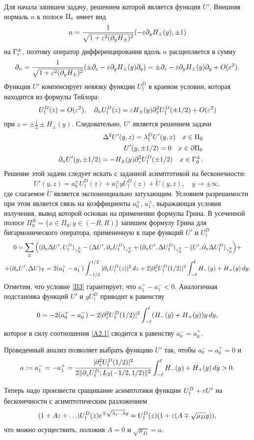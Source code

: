Для начала запишем задачу, решением которой является функция $U'$. Внешняя нормаль $n$ к полосе $\Pi_\varepsilon$ имеет вид
$$
n=\frac{1}{\sqrt{1+\varepsilon^2 (\partial_y H_\pm)^2}}(-\varepsilon \partial_y H_\pm(y), \pm 1)
$$
на $\Gamma_\varepsilon^\pm$, поэтому оператор дифференцирования вдоль $n$ расщепляется в сумму
$$
\partial_n= \frac{1}{\sqrt{1+\varepsilon^2 (\partial_y H_\pm)^2}} (\pm \partial_z - \varepsilon \partial_yH_\pm(y)\partial_y)= \pm\partial_z -\varepsilon \partial_y H_\pm(y) \partial_y+O(\varepsilon^2).
$$
Функция $U'$ компенсирует невязку функции $U_\dagger^D$ в краевом условии,
которая находится из формулы Тейлора:
$$
U_\dagger^D(z)=O(\varepsilon^2),\quad  
\partial_n U_\dagger^D(z) = \varepsilon H_\pm(y)\partial_z^2U_\dagger^D(\pm1/2) + O(\varepsilon^2)
$$
при $z=\pm\frac{1}{2}\pm H_{\pm}(y)$. Следовательно, $U'$ является решением задачи 
\begin{eqnarray*}
&&\Delta^2 U'(y,z)= \lambda_\dagger^D U'(y,z) \quad x\in \Pi_0\\
&&U'(y,\pm 1/2)=0\quad  x\in \partial\Pi_0\\
&&\partial_n U'(y,\pm 1/2) = -H_\pm(y) \partial_z^2 U_\dagger^D(\pm 1/2) \quad x\in \Gamma_0^\pm.
\end{eqnarray*}
Решение этой задачи следует искать с заданной асимптотикой на бесконечности:
$$
U'(y,z)=a_0^\pm U_\dagger^D(z) + a_1^\pm y U_\dagger^D(z) + \widetilde{U}(y,z),\quad y\to \pm \infty,
$$
где слагаемое $\widetilde{U}$ является экспоненциально затухающим. Условием разрешимости при этом является связь на коэффициенты $a_0^\pm$, $a_1^\pm$, выражающая условия излучения, вывод которой основан на применении формулы Грина. В усеченной полосе $\Pi_0^R=\{x\in \Pi_0\colon y\in(-R,R)\}$ запишем формулу Грина для бигармонического оператора, примененную к паре функций $U'$ и $U_\dagger^D$
\begin{multline*}
0=\sum_{\pm}\Big((\partial_n\Delta U',U_\dagger^D)_{\gamma_R^\pm}-(\Delta U',\partial_n U_\dagger^D)_{\gamma_R^\pm}+(\partial_n U',\Delta U_\dagger^D)_{\gamma_R^\pm}-(U',\partial_n \Delta U_\dagger^D)_{\gamma_R^\pm}\Big) + \\
+(\partial_n U',\Delta U)_\Upsilon=2(a_1^+-a_1^-)\int_{-1/2}^{1/2}|\partial_z U_\dagger^D(z)|^2\,dz + 2|\partial_z^2 U_\dagger^D(1/2)|^2 \int_{-\ell}^\ell H_-(y)+H_+(y)\, dy.
\end{multline*}
Отметим, что условие \eqref{B3} гарантирует, что $a_1^+-a_1^-<0$.
Аналогичная подстановка функций $U'$ и $yU_\dagger^D$ приводит к равенству
$$
0=-2(a_0^+-a_0^-)- 2|\partial_z^2 U_\dagger^D(1/2)|^2\int_{-\ell}^{\ell}(H_-(y)+H_{+}(y))y\,dy,
$$
которое в силу соотношения \eqref{A2.1} сводится к равенству $a_0^-=a_0^+$.

Проведенный анализ позволяет выбрать функцию $U'$ так, чтобы $a_0^-=a_0^+=0$ и
$$
a:=a_1^-=-a_1^+=\frac{|\partial_z^2 U_\dagger^D(1/2)|^2}{2\|\partial_z U_\dagger^D;L_2(-1/2,1/2)\|^2}\int_{-\ell}^\ell H_-(y)+H_+(y)\, dy>0.
$$

Теперь надо произвести сращивание асимптотики функции $U_\dagger^D+\varepsilon U'$
на бесконечности с асимптотическим разложением
$$
(1+A\varepsilon+\ldots)U_\dagger^D(z)e^{\mp \sqrt{\lambda_\dagger-\lambda} y}=U_\dagger^D(z)(1+\varepsilon(A\mp \sqrt{\mu_D}y)),
$$
что можно осуществить, положив $A=0$ и $\sqrt{\mu_D}=a$.





